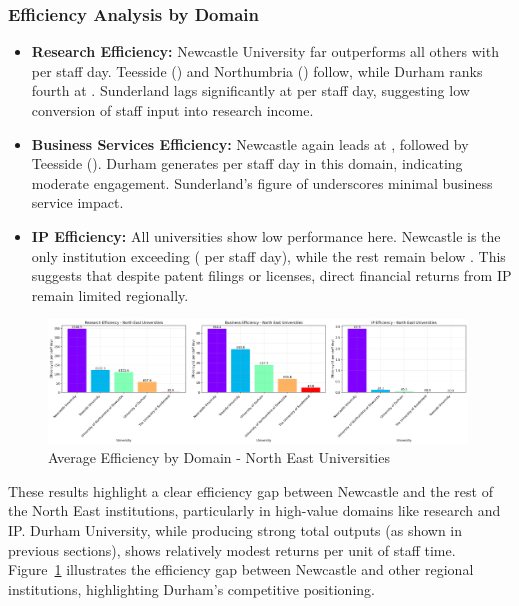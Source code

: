 \documentclass[journal,onecolumn, 10pt,draftclsnofoot]{IEEEtran}
\begin{document}
\subsubsection{Efficiency Analysis by Domain}

\begin{itemize}
    \item \textbf{Research Efficiency:} Newcastle University far outperforms all others with  per staff day. Teesside () and Northumbria () follow, while Durham ranks fourth at . Sunderland lags significantly at  per staff day, suggesting low conversion of staff input into research income.
    
    \item \textbf{Business Services Efficiency:} Newcastle again leads at , followed by Teesside (). Durham generates  per staff day in this domain, indicating moderate engagement. Sunderland's figure of  underscores minimal business service impact.
    
    \item \textbf{IP Efficiency:} All universities show low performance here. Newcastle is the only institution exceeding  ( per staff day), while the rest remain below . This suggests that despite patent filings or licenses, direct financial returns from IP remain limited regionally.
\end{itemize}



\begin{figure}[h]
\centering
\includegraphics[width=0.99\textwidth]{Fig/figure38.ne_efficiency_comparison.png}
\caption{Average Efficiency by Domain - North East Universities}
\label{fig:ne-efficiency-comparison}
\end{figure}

These results highlight a clear efficiency gap between Newcastle and the rest of the North East institutions, particularly in high-value domains like research and IP. Durham University, while producing strong total outputs (as shown in previous sections), shows relatively modest returns per unit of staff time. Figure~\ref{fig:ne-efficiency-comparison} illustrates the efficiency gap between Newcastle and other regional institutions, highlighting Durham's competitive positioning.
\end{document}
